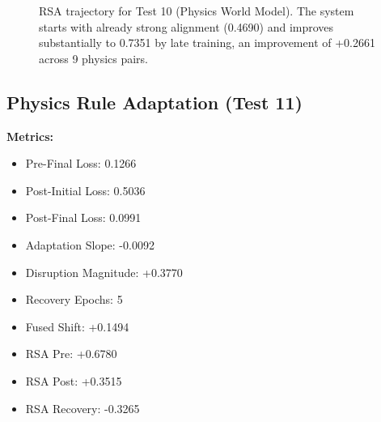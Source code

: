 \documentclass[12pt]{article}
\begin{document}
\begin{figure}[H]
\centering
{}
\caption{RSA trajectory for Test 10 (Physics World Model). The
system starts with already strong alignment (0.4690) and improves
substantially to 0.7351 by late training, an improvement of
+0.2661 across 9 physics pairs.}
\label{fig:physics_world}
\end{figure}

\subsection{Physics Rule Adaptation (Test 11)}
\label{subsec:test11}

\textbf{Metrics:}
\begin{itemize}
    \item Pre-Final Loss: 0.1266
    \item Post-Initial Loss: 0.5036
    \item Post-Final Loss: 0.0991
    \item Adaptation Slope: -0.0092
    \item Disruption Magnitude: +0.3770
    \item Recovery Epochs: 5
    \item Fused Shift: +0.1494
    \item RSA Pre: +0.6780
    \item RSA Post: +0.3515
    \item RSA Recovery: -0.3265
\end{itemize}
\end{document}
